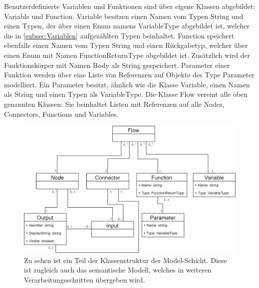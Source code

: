 \newline
Benutzerdefinierte Variablen und Funktionen sind über eigene Klassen abgebildet: Variable und Function. Variable besitzen einen Namen vom Typen String und einen Typen, der über einen Enum namens VariableType abgebildet ist, welcher die in \ref{subsec:Variablen} aufgezählten Typen beinhaltet. Function speichert ebenfalls einen Namen vom Typen String und einen Rückgabetyp, welcher über einen Enum mit Namen FunctionReturnType abgebildet ist. Zusätzlich wird der Funktionskörper mit Namen Body als String gespeichert. Parameter einer Funktion werden über eine Liste von Referenzen auf Objekte des Type Parameter modelliert. Ein Parameter besitzt, ähnlich wie die Klasse Variable, einen Namen als String und einen Typen als VariableType. Die Klasse Flow vereint alle oben genannten Klassen: Sie beinhaltet Listen mit Referenzen auf alle Nodes, Connectors, Functions und Variables. 

\begin{figure} %
	\centering
		\includegraphics[width=\textwidth]{img/FlowClassStructure.png}
	\caption[Klassenstruktur der Model-Schicht]{Zu sehen ist ein Teil der Klassenstruktur der Model-Schicht. Diese ist zugleich auch das semantische Modell, welches in weiteren Verarbeitungsschritten übergeben wird.}
	\label{fig:UML:Model-Schicht}
\end{figure}

